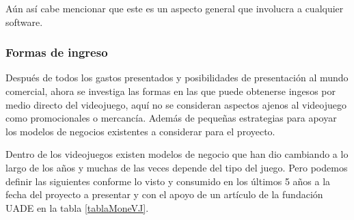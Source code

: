 Aún así cabe mencionar que este es un aspecto general que involucra a cualquier software.

\subsubsection{Formas de ingreso}
Después de todos los gastos presentados y posibilidades de presentación al mundo comercial, ahora se investiga las formas en las que puede obtenerse ingesos por medio directo del videojuego, aquí no se consideran aspectos ajenos al videojuego como promocionales o mercancía. Además de pequeñas estrategias para apoyar los modelos de negocios existentes a considerar para el proyecto.

Dentro de los videojuegos existen modelos de negocio que han dio cambiando a lo largo de los años y muchas de las veces depende del tipo del juego. Pero podemos definir las siguientes conforme lo visto y consumido en los últimos 5 años a la fecha del proyecto a presentar y con el apoyo de un artículo de la fundación UADE \cite{fundacionuade2014} en la tabla \ref{tablaMoneVJ}.

